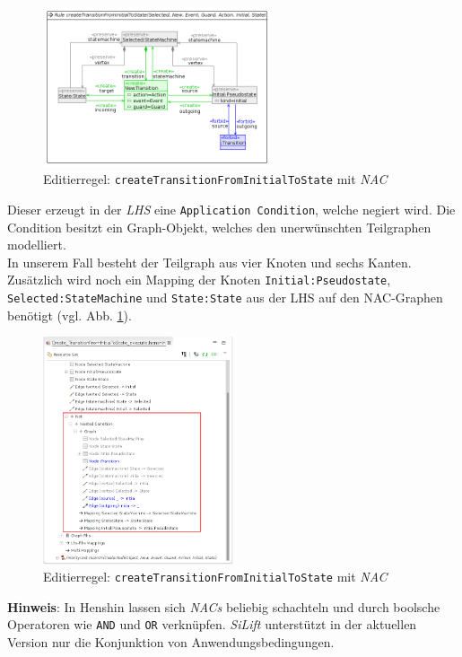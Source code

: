 \begin{figure}[H]
\centering
\includegraphics[width=0.6\textwidth]{editrules/graphics/silift-editrule_create_transitionFromInitialToState_with_forbid.png}
\caption{Editierregel: \texttt{createTransitionFromInitialToState} mit \textit{NAC}}
\label{silift-editrule_create_transitionFromInitialToState_with_forbid}
\end{figure}

Dieser erzeugt in der \textit{LHS} eine \texttt{Application Condition}, welche negiert wird.
Die Condition besitzt ein Graph-Objekt, welches den unerwünschten Teilgraphen modelliert.\\
In unserem Fall besteht der Teilgraph aus vier Knoten und sechs Kanten.
Zusätzlich wird noch ein Mapping der Knoten \texttt{Initial:Pseudostate}, \texttt{Selected:StateMachine} und \texttt{State:State} aus der LHS auf den NAC-Graphen benötigt (vgl. Abb. \ref{silift-editrule_create_transitionFromInitialToState_with_forbid}).


\begin{figure}[H]
\centering
\includegraphics[width=0.5\textwidth]{editrules/graphics/silift-editrule_create_transitionFromInitialToState_with_forbid_treeView.png}
\caption{Editierregel: \texttt{createTransitionFromInitialToState} mit \textit{NAC}}
\label{silift-editrule_create_transitionFromInitialToState_with_forbid_treeView}
\end{figure}

\textbf{Hinweis}: In Henshin lassen sich \textit{NACs} beliebig schachteln und durch boolsche Operatoren wie \texttt{AND} und \texttt{OR} verknüpfen. \textit{SiLift} unterstützt in der aktuellen Version nur die Konjunktion von Anwendungsbedingungen.

